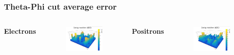 \documentclass{beamer}
\begin{document}
		\begin{frame}
			\frametitle{Theta-Phi cut average error}
			\begin{columns}
				\centering
				\Large \textbf{Electrons}
				\begin{figure}
					\centering
					\includegraphics[width = 0.95 \linewidth]{images/c_e_theta_phi_abs.png}
				\end{figure}
				\centering
				\Large \textbf{Positrons}
				\begin{figure}
					\centering
					\includegraphics[width = 0.95 \linewidth]{images/c_p_theta_phi_abs.png}
				\end{figure}
			\end{columns}
		\end{frame}
\end{document}
